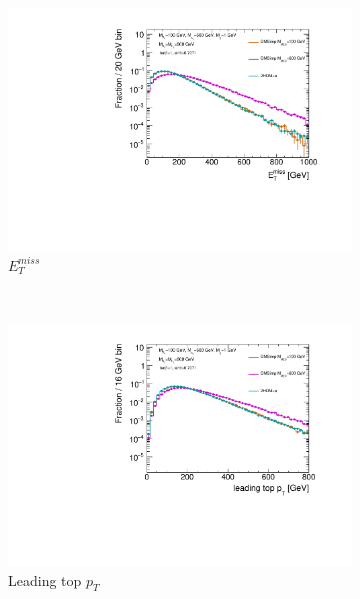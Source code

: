 \begin{figure}
  \centering
  \begin{subfigure}[b]{0.6\textwidth}
    \includegraphics[width=\textwidth]{texinputs/04_grid/figures/DMHF/benchmarking/MDM_1_Ma_100_MA_600_sinp_0.7071_tanb_1.0_VS_DMSimp_100_600_Decayed/metlog.pdf}
    \caption{$E_{T}^{miss}$}
  \end{subfigure}\\
  \begin{subfigure}[b]{0.45\textwidth}
    \includegraphics[width=\textwidth]{texinputs/04_grid/figures/DMHF/benchmarking/MDM_1_Ma_100_MA_600_sinp_0.7071_tanb_1.0_VS_DMSimp_100_600_Decayed/top1ptlog.pdf}
    \caption{Leading top $p_{T}$}
  \end{subfigure} 
  \begin{subfigure}[b]{0.45\textwidth}

\end{subfigure}
\end{figure}

